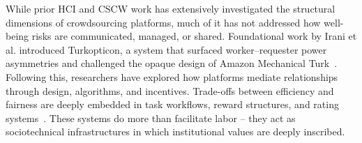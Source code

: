 

While prior HCI and CSCW work has extensively investigated the structural dimensions of crowdsourcing platforms, much of it has not addressed how well-being risks are communicated, managed, or shared. %
Foundational work by Irani et al. introduced Turkopticon, a system that surfaced worker–requester power asymmetries and challenged the opaque design of Amazon Mechanical Turk~\cite{irani2013turkopticon}. Following this, researchers have explored how platforms mediate relationships through design, algorithms, and incentives. Trade-offs between efficiency and fairness are deeply embedded in task workflows, reward structures, and rating systems~\cite{ho2015incentivizing}. These systems do more than facilitate labor -- they act as sociotechnical infrastructures in which institutional values are deeply inscribed.%

